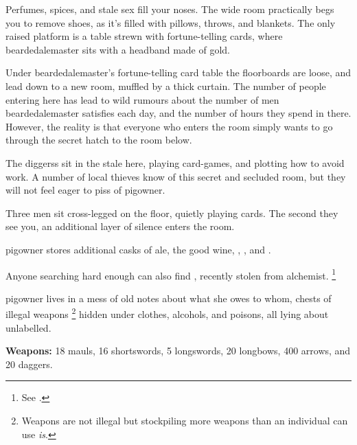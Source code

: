 \begin{multicols}{2}
\begin{boxtext}
  Perfumes, spices, and stale sex fill your noses.
  The wide room practically begs you to remove shoes, as it's filled with pillows, throws, and blankets.
  The only raised platform is a table strewn with fortune-telling cards, where \gls{beardedalemaster} sits with a headband made of gold.
\end{boxtext}

Under \gls{beardedalemaster}'s fortune-telling card table the floorboards are loose, and lead down to a new room, muffled by a thick curtain.
The number of people entering here has lead to wild rumours about the number of men \gls{beardedalemaster} satisfies each day, and the number of hours they spend in there.
However, the reality is that everyone who enters the room simply wants to go through the secret hatch to the room below.

\beardedalemaster


The \glspl{diggers} sit in the stale here, playing card-games, and plotting how to avoid work.
A number of local thieves know of this secret and secluded room, but they will not feel eager to piss of \gls{pigowner}.

\begin{boxtext}
  Three men sit cross-legged on the floor, quietly playing cards.
  The second they see you, an additional layer of silence enters the room.
\end{boxtext}



\Gls{pigowner} stores additional casks of ale, the good wine, \rations, \rations, and \rations.

Anyone searching hard enough can also find \lootTalisman, recently stolen from \gls{alchemist}.%
\footnote{See .}


\Gls{pigowner} lives in a mess of old notes about what she owes to whom, chests of illegal weapons%
\footnote{Weapons are not illegal but stockpiling more weapons than an individual can use \emph{is}.}
hidden under clothes, alcohols, and poisons, all lying about unlabelled.

\textbf{Weapons:} 18 mauls, 16 shortswords, 5 longswords, 20 longbows, 400 arrows, and 20 daggers.


\end{multicols}
